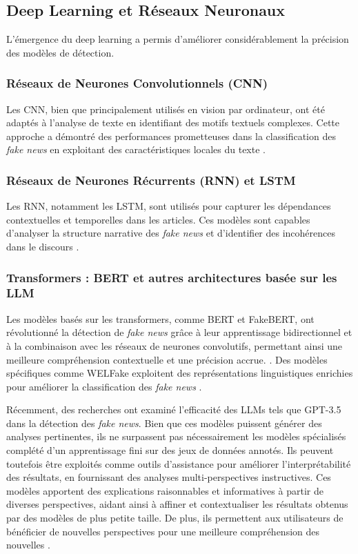 \documentclass[a4paper,12pt, twocolumn]{article}
\begin{document}
\begin{twocolumn}
\subsection{Deep Learning et Réseaux Neuronaux}
L’émergence du deep learning a permis d’améliorer considérablement la précision des modèles de détection.

\subsubsection{Réseaux de Neurones Convolutionnels (CNN)}
Les CNN, bien que principalement utilisés en vision par ordinateur, ont été adaptés à l’analyse de texte en identifiant des motifs textuels complexes. Cette approche a démontré des performances prometteuses dans la classification des \textit{fake news} en exploitant des caractéristiques locales du texte \cite{kaliyar_fakebert_2021}.

\subsubsection{Réseaux de Neurones Récurrents (RNN) et LSTM}
Les RNN, notamment les LSTM, sont utilisés pour capturer les dépendances contextuelles et temporelles dans les articles. Ces modèles sont capables d’analyser la structure narrative des \textit{fake news} et d’identifier des incohérences dans le discours \cite{rai_fake_2022}.

\subsubsection{Transformers : BERT et autres architectures basée sur les LLM}
Les modèles basés sur les transformers, comme BERT et FakeBERT, ont révolutionné la détection de \textit{fake news} grâce à leur apprentissage bidirectionnel et à la combinaison avec les réseaux de neurones convolutifs, permettant ainsi une meilleure compréhension contextuelle et une précision accrue. \cite{kaliyar_fakebert_2021}. Des modèles spécifiques comme WELFake exploitent des représentations linguistiques enrichies pour améliorer la classification des \textit{fake news} \cite{verma_welfake_2021}.

Récemment, des recherches ont examiné l’efficacité des LLMs tels que GPT-3.5 dans la détection des \textit{fake news}. Bien que ces modèles puissent générer des analyses pertinentes, ils ne surpassent pas nécessairement les modèles spécialisés complété d'un apprentissage fini sur des jeux de données annotés. Ils peuvent toutefois être exploités comme outils d’assistance pour améliorer l’interprétabilité des résultats, en fournissant des analyses multi-perspectives instructives. Ces modèles apportent des explications raisonnables et informatives à partir de diverses perspectives, aidant ainsi à affiner et contextualiser les résultats obtenus par des modèles de plus petite taille. De plus, ils permettent aux utilisateurs de bénéficier de nouvelles perspectives pour une meilleure compréhension des nouvelles  \cite{hu_bad_2024}.


\end{twocolumn}
\end{document}
